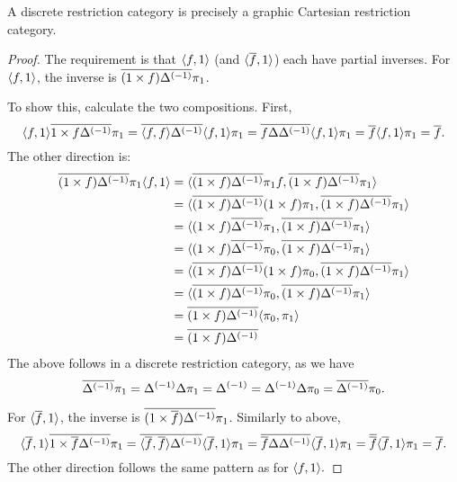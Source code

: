 \begin{lemma}\label{lem:a_discrete_crc_is_precisely_a_graphic_crc}
  A discrete restriction category is precisely a graphic Cartesian restriction category.
\end{lemma}
\begin{proof}
  The requirement is that $\langle f,1\rangle$ (and $\langle\overline{f},1\rangle$) each have partial inverses. For
  $\langle f,1\rangle$, the inverse is $\overline{(1 \times f){\Delta}^{(-1)}} \pi_1$.

  To show this, calculate  the two compositions. First,
  \[
    \<f,1\> \rst{1 \times f \inv{\Delta}} \pi_1 =
      \rst{\<f,f\> \inv{\Delta}}\<f,1\>\pi_1 %
    = \rst{f \Delta \inv{\Delta}}\<f,1\>\pi_1 %
    = \rst{f}\<f,1\>\pi_1 %
    = \rst{f}.%
  \]
  The other direction is:
  \begin{align*}
    \rst{(1 \times f)\inv{\Delta}} \pi_1 \<f,1\>
      &= \< \rst{(1 \times f)\inv{\Delta}} \pi_1 f ,
      \rst{(1 \times f)\inv{\Delta}}\pi_1 \>\\ %
    &= \< \rst{(1 \times f)\inv{\Delta}} (1 \times f) \pi_1,
      \rst{(1 \times f)\inv{\Delta}}\pi_1 \>\\ %
    &= \< (1 \times f )\rst{\inv{\Delta}} \pi_1 ,
      \rst{(1 \times f)\inv{\Delta}}\pi_1 \>\\ %
    &= \< (1 \times f) \rst{\inv{\Delta}} \pi_0 ,
      \rst{(1 \times f)\inv{\Delta}}\pi_1 \>\\ %
    &= \< \rst{(1 \times f)\inv{\Delta}} (1 \times f) \pi_0,
      \rst{(1 \times f)\inv{\Delta}}\pi_1 \>\\ %
    &= \< \rst{(1 \times f)\inv{\Delta}} \pi_0,
      \rst{(1 \times f)\inv{\Delta}}\pi_1 \>\\ %
    &= \rst{(1 \times f)\inv{\Delta}} \< \pi_0, \pi_1 \>\\ %
    &= \rst{(1 \times f)\inv{\Delta}}
  \end{align*}
  The above follows in a discrete restriction category, as we have
  \begin{equation*}
    \overline{{\Delta}^{(-1)}} \pi_1 = {\Delta}^{(-1)} \Delta \pi_1 = {\Delta}^{(-1)} = {\Delta}^{(-1)} \Delta \pi_0 = \overline{{\Delta}^{(-1)}} \pi_0.
  \end{equation*}

  For $\langle\overline{f},1\rangle$, the inverse is $\overline{(1 \times \overline{f}){\Delta}^{(-1)}} \pi_1$. Similarly
  to above,
  \[
    \<\rst{f},1\> \rst{1 \times \rst{f} \inv{\Delta}} \pi_1 =
      \rst{\<\rst{f},\rst{f}\> \inv{\Delta}}\<\rst{f},1\>\pi_1 %
    = \rst{\rst{f} \Delta \inv{\Delta}}\<\rst{f},1\>\pi_1 %
    = \rst{\rst{f}}\<\rst{f},1\>\pi_1 %
    = \rst{f}.%
  \]
  The other direction follows the same pattern as for $\langle f,1\rangle.$
\end{proof}

